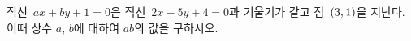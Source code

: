 직선~$ax+by+1=0$은 직선~$2x-5y+4=0$과 기울기가 같고 점~$(3{,}\mkern3mu\mathopen{}1)$을 지난다. 이때 상수 $a$, $b$에 대하여 $ab$의 값을 구하시오.
